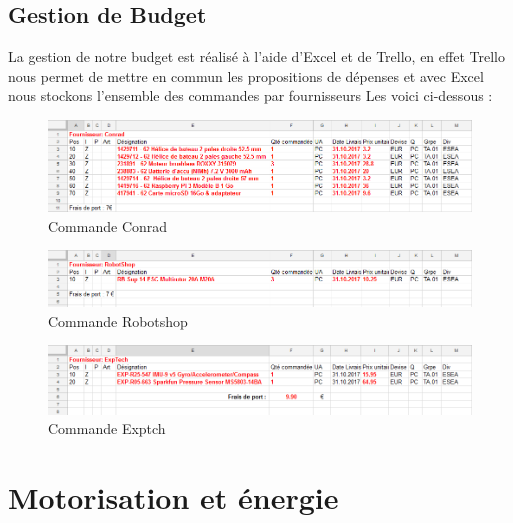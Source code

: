 \documentclass[a4paper,11pt]{report}
\begin{document}
				\section{Gestion de Budget}
				La gestion de notre budget est réalisé à l'aide d'Excel et de Trello, en effet Trello nous permet de mettre en commun les propositions de dépenses et avec Excel nous stockons l'ensemble des commandes par fournisseurs \newline \newline Les voici ci-dessous :
					\begin{figure}[!h]
							\begin{center}
								\includegraphics[scale=0.5]{Illustrations/Conrad.png}
								\caption{Commande Conrad}
							\end{center}
					\end{figure}
					\begin{figure}[!h]
							\begin{center}
								\includegraphics[scale=0.5]{Illustrations/Robotshop.png}
								\caption{Commande Robotshop}
							\end{center}
					\end{figure}
					\begin{figure}[!h]
							\begin{center}
								\includegraphics[scale=0.5]{Illustrations/Exptech.png}
								\caption{Commande Exptch}
							\end{center}
					\end{figure}
								
\chapter{Motorisation et énergie}
\end{document}
